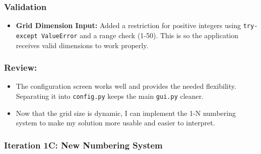 \subsubsection{Validation}
\begin{itemize}
	\item \textbf{Grid Dimension Input:} Added a restriction for positive integers using \verb|try-except ValueError| and a range check (1-50). This is so the application receives valid dimensions to work properly.
\end{itemize}



\subsubsection{Review:}
\begin{itemize}
	\item The configuration screen works well and provides the needed flexibility. Separating it into \verb|config.py| keeps the main \verb|gui.py| cleaner.
	\item Now that the grid size is dynamic, I can implement the 1-N numbering system to make my solution more usable and easier to interpret.
\end{itemize}

\newpage

\subsubsection{Iteration 1C: New Numbering System}

